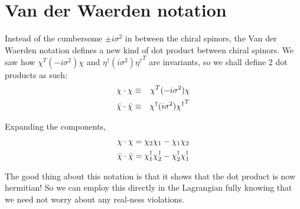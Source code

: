 \section{Van der Waerden notation}
\label{ch:2:van der waerden notation}
Instead of the cumbersome $\pm i \sigma^2$ in between the chiral spinors, the Van der Waerden notation defines a new kind of dot product between chiral spinors. We saw how $\chi^T (-i \sigma^2) \chi$ and $\eta^\dagger (i \sigma^2) {\eta^\dagger}^T$ are invariants, so we shall define 2 dot products as such:
\begin{eqnarray}
    \chi \cdot \chi &\equiv& \chi^T (-i \sigma^2) \chi \nonumber \\
    \Bar{\chi} \cdot \Bar{\chi} &\equiv& \chi^\dagger (i \sigma^2) {\chi^\dagger}^T \nonumber
\end{eqnarray}

Expanding the components,
\begin{eqnarray}
    \chi \cdot\chi = \chi_2 \chi_1 - \chi_1\chi_2 \nonext
    \Bar{\chi} \cdot \Bar{\chi} = \chi^\dagger_1 \chi^\dagger_2 - \chi^\dagger_2 \chi^\dagger_1
    \label{eqn:2:van der waerden expanded}
\end{eqnarray}

The good thing about this notation is that it shows that the dot product is now hermitian! So we can employ this directly in the Lagrangian fully knowing that we need not worry about any real-ness violations.
